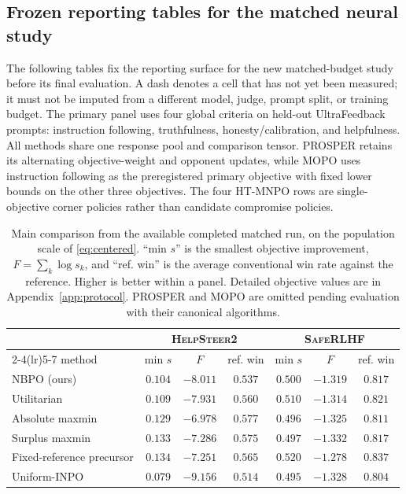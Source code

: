 \documentclass{article}
\theoremstyle{remark}
\theoremstyle{plain}
\newcommand{\NBPO}{\textsc{NBPO}}
\begin{document}
\subsection{Frozen reporting tables for the matched neural study}
\label{app:frozen-neural-tables}
The following tables fix the reporting surface for the new matched-budget study before its final evaluation.  A dash denotes a cell that has not yet been measured; it must not be imputed from a different model, judge, prompt split, or training budget.  The primary panel uses four global criteria on held-out UltraFeedback prompts: instruction following, truthfulness, honesty/calibration, and helpfulness.  All methods share one response pool and comparison tensor.  PROSPER retains its alternating objective-weight and opponent updates, while MOPO uses instruction following as the preregistered primary objective with fixed lower bounds on the other three objectives.  The four HT-MNPO rows are single-objective corner policies rather than candidate compromise policies.

\begin{table}[t]
\centering\footnotesize
\setlength{\tabcolsep}{4.0pt}
\caption{Main comparison from the available completed matched run, on the population scale of \eqref{eq:centered}. ``min $s$'' is the smallest objective improvement, $F=\sum_k\log s_k$, and ``ref. win'' is the average conventional win rate against the reference. Higher is better within a panel. Detailed objective values are in Appendix~\ref{app:protocol}. PROSPER and MOPO are omitted pending evaluation with their canonical algorithms.}
\label{tab:main-results}
\begin{tabular}{lcccccc}
\toprule
& \multicolumn{3}{c}{\textsc{HelpSteer2}} & \multicolumn{3}{c}{\textsc{SafeRLHF}}\\
\cmidrule(lr){2-4}\cmidrule(lr){5-7}
method & min $s$ & $F$ & ref. win & min $s$ & $F$ & ref. win\\
\midrule
\NBPO{} (ours) & $0.104$ & $-8.011$ & $0.537$ & $0.500$ & $-1.319$ & $0.817$\\
Utilitarian & $0.109$ & $-7.931$ & $0.560$ & $0.510$ & $-1.314$ & $0.821$\\
Absolute maxmin & $0.129$ & $-6.978$ & $0.577$ & $0.496$ & $-1.325$ & $0.811$\\
Surplus maxmin & $0.133$ & $-7.286$ & $0.575$ & $0.497$ & $-1.332$ & $0.817$\\
Fixed-reference precursor & $0.134$ & $-7.251$ & $0.565$ & $0.520$ & $-1.278$ & $0.837$\\
Uniform-INPO & $0.079$ & $-9.156$ & $0.514$ & $0.495$ & $-1.328$ & $0.804$\\
\bottomrule
\end{tabular}
\end{table}
\end{document}
